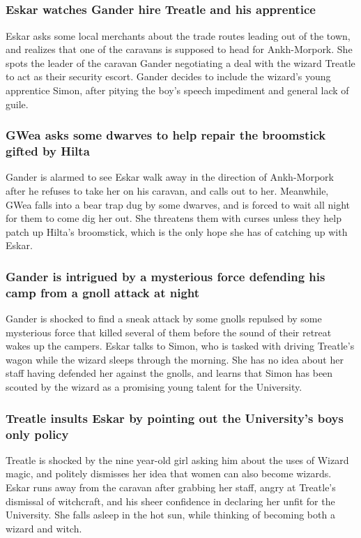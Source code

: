 \subsection{}
\subsubsection{\Gls{Eskar} watches \Gls{Gander} hire \Gls{Treatle} and his apprentice}
\Gls{Eskar} asks some local merchants about the trade routes leading out of the town, and realizes
that one of the caravans is supposed to head for Ankh-Morpork. She spots the leader of the caravan
\Gls{Gander} negotiating a deal with the wizard \Gls{Treatle} to act as their security escort.
\Gls{Gander} decides to include the wizard's young apprentice \Gls{Simon}, after pitying the boy's
speech impediment and general lack of guile.

\subsubsection{\Gls{GWea} asks some dwarves to help repair the broomstick gifted by \Gls{Hilta}}
\Gls{Gander} is alarmed to see \Gls{Eskar} walk away in the direction of Ankh-Morpork after he
refuses to take her on his caravan, and calls out to her. Meanwhile, \Gls{GWea} falls into a bear
trap dug by some dwarves, and is forced to wait all night for them to come dig her out. She
threatens them with curses unless they help patch up \Gls{Hilta}'s broomstick, which is the only
hope she has of catching up with \Gls{Eskar}.

\subsubsection{\Gls{Gander} is intrigued by a mysterious force defending his camp from a gnoll
    attack at night}
\Gls{Gander} is shocked to find a sneak attack by some gnolls repulsed by some mysterious force that
killed several of them before the sound of their retreat wakes up the campers. \Gls{Eskar} talks to
\Gls{Simon}, who is tasked with driving \Gls{Treatle}'s wagon while the wizard sleeps through the
morning. She has no idea about her staff having defended her against the gnolls, and learns that
\Gls{Simon} has been scouted by the wizard as a promising young talent for the University.

\subsubsection{\Gls{Treatle} insults \Gls{Eskar} by pointing out the University's boys only policy}
\Gls{Treatle} is shocked by the nine year-old girl asking him about the uses of Wizard magic, and
politely dismisses her idea that women can also become wizards. \Gls{Eskar} runs away from the
caravan after grabbing her staff, angry at \Gls{Treatle}'s dismissal of witchcraft, and his
sheer confidence in declaring her unfit for the University. She falls asleep in the hot sun, while
thinking of becoming both a wizard and witch.

